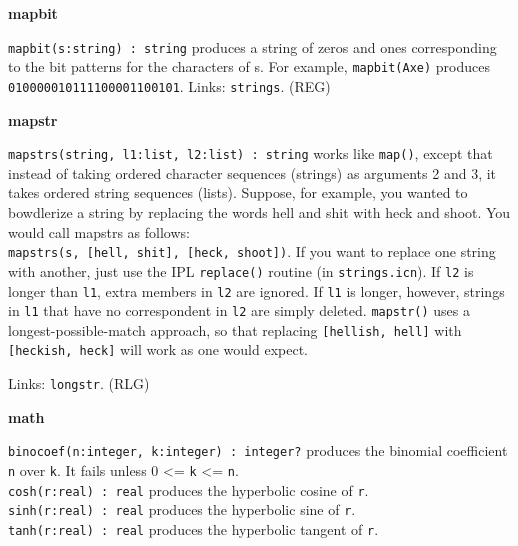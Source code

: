 {\sffamily\bfseries
mapbit}

\texttt{mapbit(s:string) : string} produces a string of zeros and ones
corresponding to the bit patterns for the characters of s. For example,
\texttt{mapbit({\textquotedbl}Axe{\textquotedbl})} produces
\texttt{{\textquotedbl}010000010111100001100101{\textquotedbl}}. Links:
\texttt{strings}. (REG)

{\sffamily\bfseries
mapstr}

\texttt{mapstrs(string, l1:list, l2:list) : string} works like
\texttt{map()}, except that instead of taking ordered character
sequences (strings) as arguments 2 and 3, it takes ordered string
sequences (lists). Suppose, for example, you wanted to
bowdlerize a string by replacing the words
{\textquotedbl}hell{\textquotedbl} and
{\textquotedbl}shit{\textquotedbl} with
{\textquotedbl}heck{\textquotedbl} and
{\textquotedbl}shoot.{\textquotedbl} You would call mapstrs as
follows:\\
\texttt{mapstrs(s, [{\textquotedbl}hell{\textquotedbl},
{\textquotedbl}shit{\textquotedbl}],
[{\textquotedbl}heck{\textquotedbl},
{\textquotedbl}shoot{\textquotedbl}])}. If you want to replace one
string with another, just use the IPL \texttt{replace()} routine (in
\texttt{strings.icn}). If \texttt{l2} is longer than \texttt{l1}, extra
members in \texttt{l2} are ignored. If \texttt{l1} is longer, however,
strings in \texttt{l1} that have no correspondent in \texttt{l2} are
simply deleted. \texttt{mapstr()} uses a longest-possible-match
approach, so that replacing
\texttt{[{\textquotedbl}hellish{\textquotedbl},
{\textquotedbl}hell{\textquotedbl}]} with
\texttt{[{\textquotedbl}heckish{\textquotedbl},
{\textquotedbl}heck{\textquotedbl}]} will work as one would expect.

Links: \texttt{longstr}. (RLG)

{\sffamily\bfseries
math}

\texttt{binocoef(n:integer, k:integer) : integer?} produces the
binomial coefficient \texttt{n} over
\texttt{k}. It fails unless 0 {\textless}= \texttt{k} {\textless}=
\texttt{n}.\\
\texttt{cosh(r:real) : real} produces the hyperbolic cosine of \texttt{r}.\\
\texttt{sinh(r:real) : real} produces the hyperbolic sine of
\texttt{r}.\\
\texttt{tanh(r:real) : real} produces the hyperbolic tangent of
\texttt{r}.

